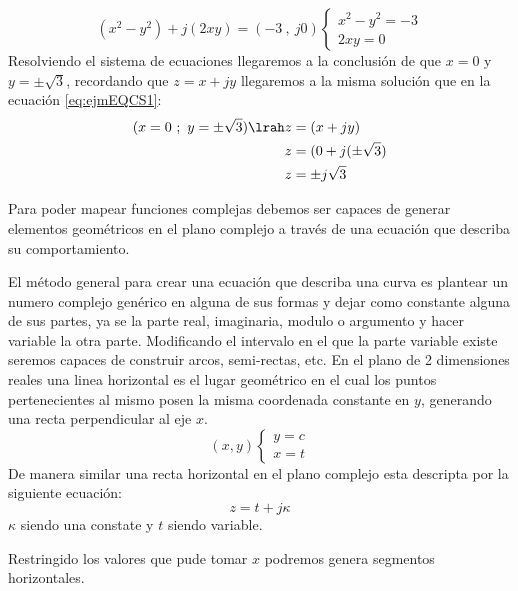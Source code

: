 \begin{equation}
(x^2-y^2)+j(2xy)=(-3\ ,\ j0)
    \begin{cases}
        x^2-y^2=-3\\
        2xy=0
    \end{cases}
\end{equation}
Resolviendo el sistema de ecuaciones llegaremos a la conclusión de que $x=0$ y $y=\pm \sqrt{3}$, recordando que $z=x+jy$ llegaremos a la misma solución que en la ecuación \ref{eq:ejmEQCS1}:
\begin{equation}
\begin{aligned}
    (x=0\ ;\ y=\pm \sqrt{3})\lrah z&=(x+jy)\\
                                z&=(0+j(\pm\sqrt{3})\\
                                z&=\pm j\sqrt{3}
\end{aligned}
\end{equation}

Para poder mapear funciones complejas debemos ser capaces de generar elementos geométricos en el plano complejo a través de una ecuación que describa su comportamiento. 

El método general para crear una ecuación que describa una curva es plantear un numero complejo genérico en alguna de sus formas y dejar como constante alguna de sus partes, ya se la parte real, imaginaria, modulo o argumento y hacer variable la otra parte. Modificando el intervalo en el que la parte variable existe  seremos capaces de construir arcos, semi-rectas, etc.
En el plano de 2 dimensiones reales una linea horizontal es el lugar geométrico en el cual los puntos pertenecientes al mismo posen la misma coordenada constante en $y$, generando una recta perpendicular al eje $x$.
\begin{equation}
    (x,y)\begin{cases}
        y=c\\
        x=t
    \end{cases}
\end{equation}
De manera similar una recta horizontal en el plano complejo esta descripta por la siguiente ecuación:
\begin{equation}\label{eq:DeflhF}
    z=t+j\kappa
\end{equation}
$\kappa$ siendo una constate y $t$ siendo variable.
\begin{figure}[H]
    \centering
    \begin{minipage}{0.45\textwidth}
        \centering
        
    \end{minipage}
    \begin{minipage}{0.45\textwidth}
        \centering
        
    \end{minipage}
    \caption{}
    \label{fig:ComLHF}
\end{figure}
Restringido los valores que pude tomar $x$ podremos genera segmentos horizontales.

